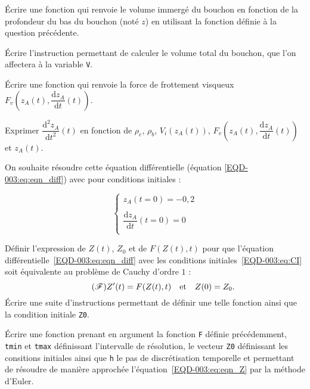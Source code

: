 \question{} Écrire une fonction  qui renvoie le volume immergé du bouchon en fonction de la profondeur du bas du bouchon (noté $z$) en utilisant la fonction définie à la question précédente.

\question{} Écrire l'instruction permettant de calculer le volume total du bouchon, que l'on affectera à la variable \texttt V.

\question{} Écrire une fonction  qui renvoie la force de frottement visqueux $F_v\left(z_A(t),\dfrac{\mathrm{d}z_A}{\mathrm{d}t}(t)\right)$. 

\question{} Exprimer $\dfrac{\mathrm{d}^2z_A}{\mathrm{d}t^2}(t)$ en fonction de $\rho_{e}$, $\rho_b$, $V_i(z_A(t))$, $F_v\left(z_A(t),\dfrac{\mathrm{d}z_A}{\mathrm{d}t}(t)\right)$ et $z_A(t)$. 


On souhaite résoudre cette équation différentielle (équation \ref{EQD-003:eq:eqn_diff}) avec pour conditions initiales : 

\begin{equation}\tag{CI}\label{EQD-003:eq:CI}
\left\{
\begin{array}{l}
z_A(t=0)=-0,2\\
\\
\dfrac{\mathrm{d}z_A}{\mathrm{d}t}(t=0)=0\\
\end{array}
\right.
\end{equation}

\question{} Définir l'expression de $Z(t)$, $Z_0$ et de $F(Z(t),t)$ pour que l'équation différentielle~\eqref{EQD-003:eq:eqn_diff} avec les conditions initiales~\eqref{EQD-003:eq:CI} soit équivalente au problème de Cauchy d'ordre $1$ : 
\begin{equation}\tag{$\mathscr{F}$}\label{EQD-003:eq:eqn_Z}
    Z'(t)=F(Z(t),t)\quad\textrm{et}\quad Z(0) = Z_0.
\end{equation}
Écrire une suite d'instructions permettant de définir une telle fonction  ainsi que la condition initiale \texttt{Z0}.
 

\question{} Écrire une fonction  prenant en argument la fonction \texttt F définie précédemment, \texttt{tmin} et \texttt{tmax} définissant l'intervalle de résolution, le vecteur \texttt{Z0} définissant les consitions initiales ainsi que \texttt h le pas de discrétisation temporelle et permettant de résoudre de manière approchée l'équation~\eqref{EQD-003:eq:eqn_Z} par la méthode d'Euler.

